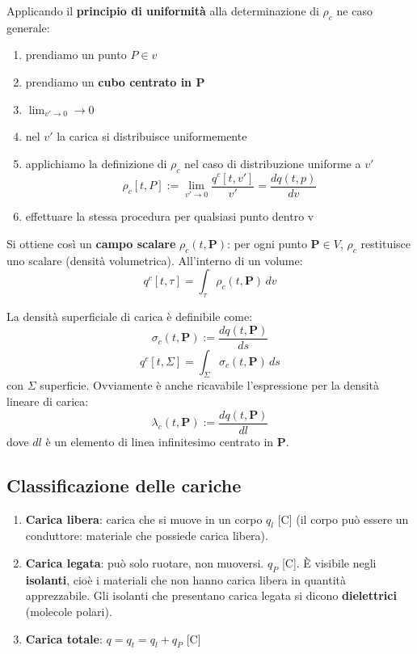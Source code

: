         Applicando il \textbf{principio di uniformità} alla determinazione di $\rho_c$ ne caso generale:
        \begin{enumerate}
            \item prendiamo un punto $P \in v$
            \item prendiamo un \textbf{cubo centrato in P}
            \item $\lim_{v' \to 0} \rightarrow 0$
            \item nel $v'$ la carica si distribuisce uniformemente
            \item applichiamo la definizione di $\rho_c$ nel caso di distribuzione uniforme a $v'$\\
            \begin{equation}
                \rho_c[t,P] := \lim_{v' \to 0} \frac{q^c[t,v']}{v'} = \frac{dq(t,p)}{dv}
            \end{equation}
            \item effettuare la stessa procedura per qualsiasi punto dentro v
        \end{enumerate}

Si ottiene così un \textbf{campo scalare} $\rho_c(t,\mathbf{P})$: per ogni punto $\mathbf{P} \in V$, $\rho_c$ restituisce uno scalare (densità volumetrica). All'interno di un volume:
\[
q^c[t,\tau] = \int_\tau \rho_c(t,\mathbf{P}) \, dv
\]

La densità superficiale di carica è definibile come:
\[
\sigma_c(t,\mathbf{P}) := \frac{dq(t,\mathbf{P})}{ds}
\]
\[
q^c[t,\Sigma] = \int_\Sigma \sigma_c(t,\mathbf{P}) \, ds
\]
con $\Sigma$ superficie. Ovviamente è anche ricavabile l'espressione per la densità lineare di carica:
\[
\lambda_c(t,\mathbf{P}) := \frac{dq(t,\mathbf{P})}{dl}
\]
dove $dl$ è un elemento di linea infinitesimo centrato in $\mathbf{P}$.

\subsection{Classificazione delle cariche}
\begin{enumerate}
    \item \textbf{Carica libera}: carica che si muove in un corpo $q_l$ [C] (il corpo può essere un conduttore: materiale che possiede carica libera).
    
    \item \textbf{Carica legata}: può solo ruotare, non muoversi. $q_P$ [C]. È visibile negli \textbf{isolanti}, cioè i materiali che non hanno carica libera in quantità apprezzabile. Gli isolanti che presentano carica legata si dicono \textbf{dielettrici} (molecole polari).
    
    \item \textbf{Carica totale}: $q = q_t = q_l + q_P$ [C]
\end{enumerate}

